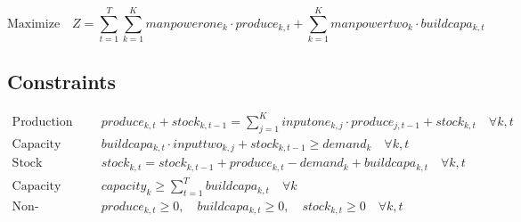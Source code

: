 \documentclass{article}
\begin{document}
\[
\text{Maximize} \quad Z = \sum_{t=1}^{T} \sum_{k=1}^{K} manpowerone_{k} \cdot produce_{k,t} + \sum_{k=1}^{K} manpowertwo_{k} \cdot buildcapa_{k,t}
\]

\subsection*{Constraints}

\begin{align*}
\text{Production Balance:} & \quad produce_{k,t} + stock_{k,t-1} = \sum_{j=1}^{K} inputone_{k,j} \cdot produce_{j,t-1} + stock_{k,t} \quad \forall k, t \\
\text{Capacity Build:} & \quad buildcapa_{k,t} \cdot inputtwo_{k,j} + stock_{k,t-1} \geq demand_{k} \quad \forall k, t \\
\text{Stock Evolution:} & \quad stock_{k,t} = stock_{k,t-1} + produce_{k,t} - demand_{k} + buildcapa_{k,t} \quad \forall k, t \\
\text{Capacity Constraints:} & \quad capacity_{k} \geq \sum_{t=1}^{T} buildcapa_{k,t} \quad \forall k \\
\text{Non-negativity:} & \quad produce_{k,t} \geq 0, \quad buildcapa_{k,t} \geq 0, \quad stock_{k,t} \geq 0 \quad \forall k, t
\end{align*}
\end{document}

